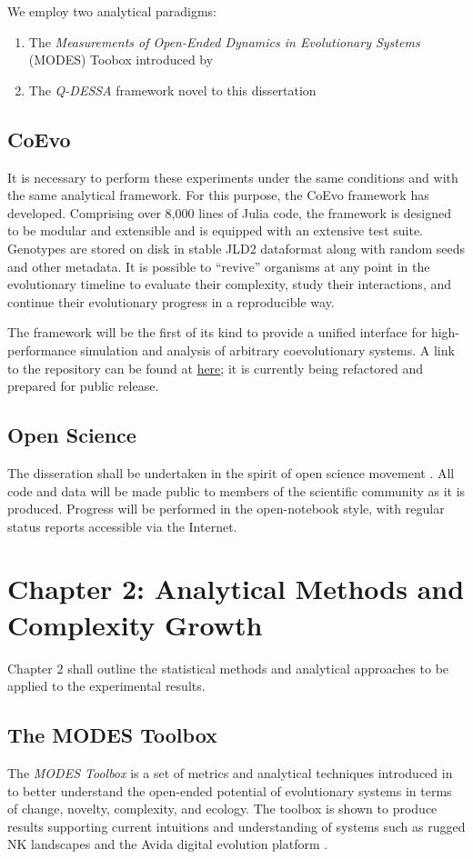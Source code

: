 \documentclass{article}
\begin{document}
We employ two analytical paradigms:
\begin{enumerate}
    \item The \textit{Measurements of Open-Ended Dynamics in Evolutionary Systems} (MODES) Toobox
        introduced by \citet{dolson2019modes}
    \item The \textit{Q-DESSA} framework novel to this dissertation
\end{enumerate}

\subsection*{CoEvo}
It is necessary to perform these experiments under the same conditions and with the same analytical framework.
For this purpose, the CoEvo framework has developed. Comprising over 8,000 lines of Julia code,
the framework is designed to be modular and extensible and is equipped with an extensive test
suite. Genotypes are stored on disk in stable JLD2 dataformat along with random seeds and other metadata.
It is possible to ``revive'' organisms at any point in the evolutionary timeline to evaluate 
their complexity, study their interactions, and continue their evolutionary progress in a 
reproducible way. 

The framework will be the first of its kind to provide a unified interface for high-performance 
simulation and analysis of arbitrary coevolutionary systems. A link to the repository can be 
found at \href{https://github.com/twillkens/coevo}{here}; it is currently being refactored and
prepared for public release.

\subsection*{Open Science}
The disseration shall be undertaken in the spirit of open science movement 
\citep{vicente2018open}. All code and data
will be made public to members of the scientific community as it is produced. Progress will be 
performed in the open-notebook style, with regular status reports accessible via the Internet.

\section*{Chapter 2: Analytical Methods and Complexity Growth}
Chapter 2 shall outline the statistical methods and analytical approaches to be applied to the
experimental results.

\subsection*{The MODES Toolbox}
The \textit{MODES Toolbox} is a set of metrics and analytical techniques introduced in 
\cite{dolson2019modes} to better understand the open-ended potential of evolutionary systems in terms
 of change, novelty, complexity, and ecology. The toolbox is shown to produce results supporting
  current intuitions and understanding of systems such as rugged NK landscapes and the Avida 
  digital evolution platform \citep{Lenski2003TheEO, KAUFFMAN198711}. 
\end{document}
